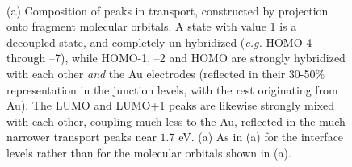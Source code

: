 \documentclass[aip,jcp,a4paper,reprint,floatfix,superscriptaddress]{revtex4-1}
\newcommand{\eg}{\emph{e.g.}\xspace}
\begin{document}
\begin{figure}
\\
\caption{(a) Composition of peaks in transport, constructed by projection onto fragment molecular orbitals. A state with value 1 is a decoupled state, and completely un-hybridized (\eg HOMO-4 through --7), while HOMO-1, --2 and HOMO are strongly hybridized with each other \emph{and} the Au electrodes (reflected in their 30-50\% representation in the junction levels, with the rest originating from Au). The LUMO and LUMO+1 peaks are likewise strongly mixed with each other, coupling much less to the Au, reflected in the much narrower transport peaks near $1.7$ eV. (a) As in (a) for the interface levels rather than for the molecular orbitals shown in (a). }\label{peak-compositions}
\end{figure}
\end{document}
